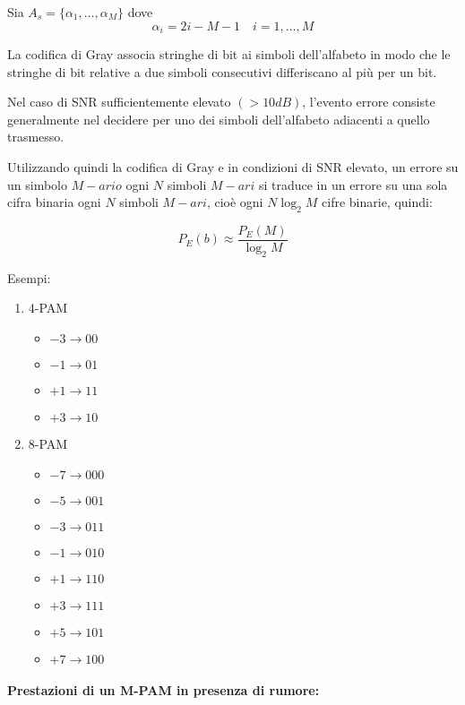 Sia \( A_s = \{\alpha_1, \ldots, \alpha_M\} \) dove
\[
    \alpha_i = 2i - M - 1 \quad i = 1, \ldots, M
\]

La codifica di Gray associa stringhe di bit ai simboli dell'alfabeto in modo che le stringhe di bit relative a due simboli consecutivi differiscano al più per un bit.

Nel caso di SNR sufficientemente elevato \( (> 10 dB) \), l'evento errore consiste generalmente nel decidere per uno dei simboli dell'alfabeto adiacenti a quello trasmesso.

Utilizzando quindi la codifica di Gray e in condizioni di SNR elevato, un errore su un simbolo \( M-ario \) ogni \( N \) simboli  \( M-ari \) si traduce in un errore su una sola cifra binaria ogni \( N \) simboli \( M-ari \), cioè ogni \( N \log_2 M \) cifre binarie, quindi:

\[
    P_E(b) \approx \frac{P_E(M)}{\log_2 M}
\]


Esempi:

\begin{enumerate}
    \item 4-PAM
          \begin{itemize}
              \item $-3 \rightarrow 00$
              \item $-1 \rightarrow 01$
              \item $+1 \rightarrow 11$
              \item $+3 \rightarrow 10$
          \end{itemize}

    \item 8-PAM
          \begin{itemize}
              \item $-7 \rightarrow 000$
              \item $-5 \rightarrow 001$
              \item $-3 \rightarrow 011$
              \item $-1 \rightarrow 010$
              \item $+1 \rightarrow 110$
              \item $+3 \rightarrow 111$
              \item $+5 \rightarrow 101$
              \item $+7 \rightarrow 100$
          \end{itemize}
\end{enumerate}
\paragraph{Prestazioni di un M-PAM in presenza di rumore:}

